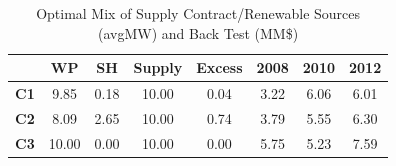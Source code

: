 %
\begin{table}
	\renewcommand{\arraystretch}{1.0}
	\centering
	\caption{Optimal Mix of Supply Contract/Renewable Sources (avgMW) and Back Test (MM\$)}
	\begin{tabular}{ r | c  c  c | c || c  c  c }
		& \textbf{WP} & \textbf{SH} & \textbf{Supply} & \textbf{Excess} & \textbf{2008} & \textbf{2010} & \textbf{2012} \\
		\hline
		\textbf{C1} & 9.85 & 0.18 & 10.00 & 0.04 & 3.22 & 6.06 & 6.01 \\
		\textbf{C2} & 8.09 & 2.65 & 10.00 & 0.74 & 3.79 & 5.55 & 6.30 \\
		\textbf{C3} & 10.00 & 0.00 & 10.00 & 0.00 & 5.75 & 5.23 & 7.59
	\end{tabular}
	\label{ContractingStrat}
\end{table}

